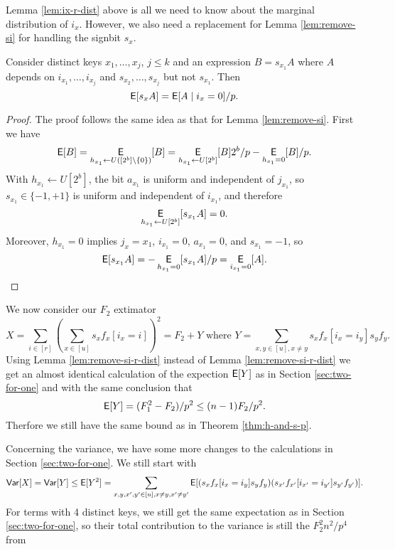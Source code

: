 Lemma \ref{lem:ix-r-dist} above is all we need to know about the
marginal distribution of $i_x$. However, we also need a replacement
for Lemma \ref{lem:remove-si} for handling the signbit $s_x$.
\begin{lemma}\label{lem:remove-si-r-dist} Consider distinct keys
$x_1,\ldots,x_j$, $j\leq k$ and an expression $B=s_{x_1}A$ where $A$
depends on $i_{x_1},\ldots,i_{x_j}$ and $s_{x_2},\ldots,s_{x_j}$ but not
$s_{x_1}$. 
Then
\begin{equation}\label{eq:remove-si-r-dist}
\E[s_xA]=\E[A\suchthat i_x=0]/p.
\end{equation}
\end{lemma}
\begin{proof}
The proof follows the same idea as that for Lemma \ref{lem:remove-si}.
First we have
\[\operatorname*{\sf{E}}[B]=\operatorname*{\sf{E}}_{h_{x_1}\gets U([2^b]\setminus\{0\})}[B]=\operatorname*{\sf{E}}_{h_{x_1}\gets U[2^b]}[B]2^b/p-\operatorname*{\sf{E}}_{h_{x_1}=0}[B]/p.\]
With $h_{x_1}\gets U[2^b]$, the bit $a_{x_1}$ is uniform and 
independent of $j_{x_1}$, so $s_{x_1}\in\{-1,+1\}$ is uniform and 
independent of $i_{x_1}$, and therefore 
\[\operatorname*{\sf{E}}_{h_{x_1}\gets U[2^b]}[s_{x_1}A]=0.\]
Moreover, $h_{x_1}=0$ implies $j_x={x_1}$, $i_{x_1}=0$, $a_{x_1}=0$,
and $s_{x_1}=-1$,
so 
\[\operatorname*{\sf{E}}[s_{x_1}A]=-\operatorname*{\sf{E}}_{h_{x_1}=0}[s_{x_1}A]/p=\operatorname*{\sf{E}}_{i_{x_1}=0}[A].\]
\end{proof}
We now consider our $F_2$ extimator
\[X=\sum_{i\in[r]}\left( \sum_{x\in[u]}s_x f_x[i_x=i]\right)^2\!
=F_2+Y\mbox{ where }Y=\sum_{x,y\in[u],x\neq y}
s_x f_x[i_x=i_y]s_y f_y.\]
Using Lemma \ref{lem:remove-si-r-dist} instead of Lemma
\ref{lem:remove-si-r-dist} we get an almost identical calculation 
of the expection $\operatorname*{\sf{E}}[Y]$ as
in Section \ref{sec:two-for-one} and with the same
conclusion that 
\begin{equation}\label{eq:E-Mersenne-arb-r}
\operatorname*{\sf{E}}[Y]=(F_1^2-F_2)/p^2\leq (n-1)F_2/p^2.
\end{equation}
Therfore we still have the same bound  as in Theorem \ref{thm:h-and-s-p}.

Concerning the variance, we have some more changes to the 
calculations in Section \ref{sec:two-for-one}.
We still start with
\[{\sf Var}[X]={\sf Var}[Y]\leq \operatorname*{\sf{E}}[Y^2]=
\sum_{x,y,x',y'\in[u],x\neq y,x'\neq y'}\operatorname*{\sf{E}}[(s_x f_x[i_x=i_y]s_y f_y)
  (s_{x'}f_{x'}[i_{x'}=i_{y'}]s_{y'} f_{y'})].\] 
For terms with 4 distinct keys, we still get the same expectation
as in Section \ref{sec:two-for-one}, so their
total contribution to the variance is still the $F_2^2 n^2/p^4$ from

